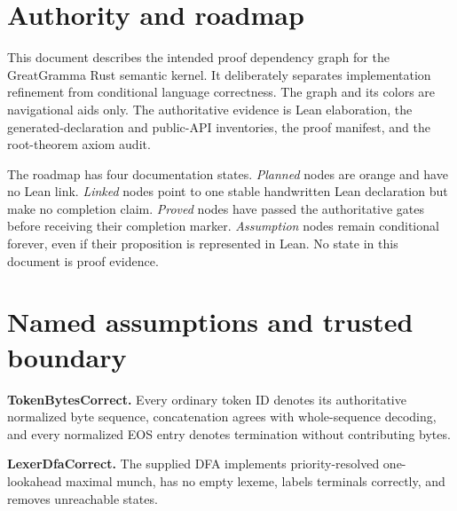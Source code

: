 
\section{Authority and roadmap}

This document describes the intended proof dependency graph for the
GreatGramma Rust semantic kernel.  It deliberately separates implementation
refinement from conditional language correctness.  The graph and its colors
are navigational aids only.  The authoritative evidence is Lean elaboration,
the generated-declaration and public-API inventories, the proof manifest, and
the root-theorem axiom audit.

The roadmap has four documentation states.  \emph{Planned} nodes are orange
and have no Lean link.  \emph{Linked} nodes point to one stable handwritten
Lean declaration but make no completion claim.  \emph{Proved} nodes have
passed the authoritative gates before receiving their completion marker.
\emph{Assumption} nodes remain conditional forever, even if their proposition
is represented in Lean.  No state in this document is proof evidence.

\section{Named assumptions and trusted boundary}

\begin{assumption}
  \label{asm:token-bytes-correct}
  \notready
  \textbf{TokenBytesCorrect.}
  Every ordinary token ID denotes its authoritative normalized byte sequence,
  concatenation agrees with whole-sequence decoding, and every normalized EOS
  entry denotes termination without contributing bytes.
\end{assumption}

\begin{assumption}
  \label{asm:lexer-dfa-correct}
  \notready
  \textbf{LexerDfaCorrect.}
  The supplied DFA implements priority-resolved one-lookahead maximal munch,
  has no empty lexeme, labels terminals correctly, and removes unreachable
  states.
\end{assumption}

